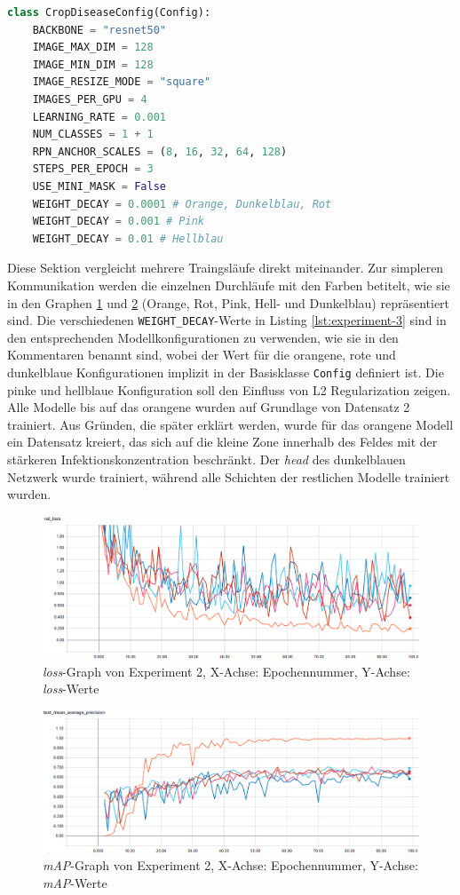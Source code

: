 \begin{lstlisting}[language=python,caption={Konfiguration für Experiment 3},captionpos=b,label=lst:experiment-3]
class CropDiseaseConfig(Config):
    BACKBONE = "resnet50"
    IMAGE_MAX_DIM = 128
    IMAGE_MIN_DIM = 128
    IMAGE_RESIZE_MODE = "square"
    IMAGES_PER_GPU = 4
    LEARNING_RATE = 0.001
    NUM_CLASSES = 1 + 1
    RPN_ANCHOR_SCALES = (8, 16, 32, 64, 128)
    STEPS_PER_EPOCH = 3
    USE_MINI_MASK = False
    WEIGHT_DECAY = 0.0001 # Orange, Dunkelblau, Rot
    WEIGHT_DECAY = 0.001 # Pink
    WEIGHT_DECAY = 0.01 # Hellblau
\end{lstlisting}
\noindent
Diese Sektion vergleicht mehrere Traingsläufe direkt miteinander. Zur simpleren Kommunikation werden die einzelnen Durchläufe mit den Farben betitelt, wie sie in den Graphen \ref{fig:val-loss-3} und \ref{fig:map-3} (Orange, Rot, Pink, Hell- und Dunkelblau) repräsentiert sind. Die verschiedenen \texttt{WEIGHT\_DECAY}-Werte in Listing \ref{lst:experiment-3} sind in den entsprechenden Modellkonfigurationen zu verwenden, wie sie in den Kommentaren benannt sind, wobei der Wert für die orangene, rote und dunkelblaue Konfigurationen implizit in der Basisklasse \texttt{Config} definiert ist. Die pinke und hellblaue Konfiguration soll den Einfluss von L2 Regularization zeigen. Alle Modelle bis auf das orangene wurden auf Grundlage von Datensatz 2 trainiert. Aus Gründen, die später erklärt werden, wurde für das orangene Modell ein Datensatz kreiert, das sich auf die kleine Zone innerhalb des Feldes mit der stärkeren Infektionskonzentration beschränkt. Der \textit{head} des dunkelblauen Netzwerk wurde trainiert, während alle Schichten der restlichen Modelle trainiert wurden.

\begin{figure}[ht]
	\centering
    \includegraphics[width=.7\textwidth]{pics/val-loss-3.PNG}
    \caption{\textit{loss}-Graph von Experiment 2, X-Achse: Epochennummer, Y-Achse: \textit{loss}-Werte}
    \label{fig:val-loss-3}
\end{figure}

\begin{figure}[ht]
	\centering
    \includegraphics[width=.7\textwidth]{pics/map-3.PNG}
    \caption{\textit{mAP}-Graph von Experiment 2, X-Achse: Epochennummer, Y-Achse: \textit{mAP}-Werte}
    \label{fig:map-3}
\end{figure}


